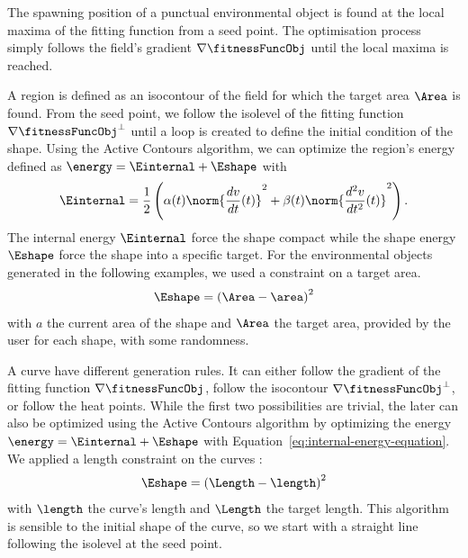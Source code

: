 The spawning position of a punctual environmental object is found at the local maxima of the fitting function from a seed point. The optimisation process simply follows the field's gradient $\nabla \fitnessFuncObj$ until the local maxima is reached.

A region is defined as an isocontour of the field for which the target area $\Area$ is found. From the seed point, we follow the isolevel of the fitting function $\nabla \fitnessFuncObj^\perp$ until a loop is created to define the initial condition of the shape. Using the Active Contours algorithm, we can optimize the region's energy defined as $\energy = \Einternal + \Eshape$ with  
\begin{align}
    \label{eq:internal-energy-equation}
    \Einternal = \frac{1}{2} \left( \alpha(t) \norm{\frac{d v}{d t}(t)}^2 + \beta(t) \norm{\frac{d^2 v}{d t^2}(t)}^2  \right).
\end{align}
The internal energy $\Einternal$ force the shape compact while the shape energy $\Eshape$ force the shape into a specific target. For the environmental objects generated in the following examples, we used a constraint on a target area.
\begin{align}
    \label{eq:area-target-equation}
    \Eshape = \left( \Area - \area \right)^2
\end{align}
with $a$ the current area of the shape and $\Area$ the target area, provided by the user for each shape, with some randomness.

A curve have different generation rules. It can either follow the gradient of the fitting function $\nabla \fitnessFuncObj$, follow the isocontour $\nabla \fitnessFuncObj^\perp$, or follow the heat points.
While the first two possibilities are trivial, the later can also be optimized using the Active Contours algorithm by optimizing the energy $\energy = \Einternal + \Eshape$ with Equation~\eqref{eq:internal-energy-equation}. We applied a length constraint on the curves : 
\begin{align*}
    \Eshape = \left( \Length - \length \right)^2
\end{align*}
with $\length$ the curve's length and $\Length$ the target length. This algorithm is sensible to the initial shape of the curve, so we start with a straight line following the isolevel at the seed point.

